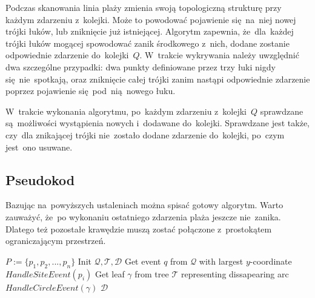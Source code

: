 \documentclass[skorowidz,autorrok,backref,xodstep,oswiadczenie]{wmimgr}
\begin{document}
Podczas skanowania linia plaży zmienia swoją topologiczną strukturę przy każdym zdarzeniu z~kolejki. Może to powodować pojawienie się~na~niej nowej trójki łuków, lub zniknięcie już istniejącej. Algorytm zapewnia, że~dla~każdej trójki łuków mogącej spowodować zanik środkowego z~nich, dodane zostanie odpowiednie zdarzenie do~kolejki~$Q$. W~trakcie wykrywania należy uwzględnić dwa szczególne przypadki: dwa punkty definiowane przez trzy łuki nigdy się~nie~spotkają, oraz zniknięcie całej trójki zanim nastąpi odpowiednie zdarzenie poprzez pojawienie się~pod~nią~nowego łuku.

W~trakcie wykonania algorytmu, po~każdym zdarzeniu z~kolejki~$Q$ sprawdzane są~możliwości wystąpienia nowych i~dodawane do~kolejki. Sprawdzane jest także, czy~dla znikającej trójki nie~zostało dodane zdarzenie do~kolejki, po~czym jest~ono usuwane.

\subsection{Pseudokod}

Bazując na~powyższych ustaleniach można spisać gotowy algorytm. Warto zauważyć, że~po wykonaniu ostatniego zdarzenia plaża jeszcze nie~zanika. Dlatego też pozostałe krawędzie muszą zostać połączone z~prostokątem ograniczającym przestrzeń.

\begin{algorithm}
\caption{$VoronoiDiagram(P)$ \cite{geometria}}
\label{fortune}  %
\begin{algorithmic}
    \REQUIRE $P := \{p_{1}, p_{2}, ... , p_{n}\}$
    \STATE Init $\mathcal{Q, T, D}$
        \STATE Get event $q$ from $\mathcal{Q}$ with largest $y$-coordinate
            \STATE $HandleSiteEvent(p_{i})$
        \ELSE
            \STATE Get leaf $\gamma$ from tree $\mathcal{T}$ representing dissapearing arc
            \STATE $HandleCircleEvent(\gamma)$
        \ENDIF
    \ENDWHILE
    \RETURN $\mathcal{D}$
\end{algorithmic}
\end{algorithm}
\end{document}
